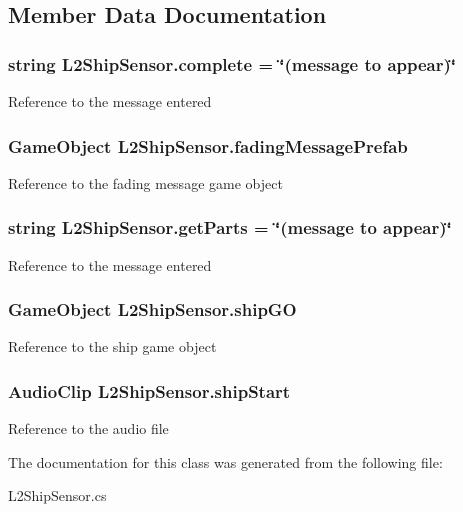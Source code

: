 \subsection{Member Data Documentation}
\hypertarget{class_l2_ship_sensor_aa262461caa8e7f1eaa5e65cc949cd16b}{
\subsubsection[{complete}]{\setlength{\rightskip}{0pt plus 5cm}string L2\-Ship\-Sensor.\-complete = \char`\"{}(message to appear)\char`\"{}}}\label{class_l2_ship_sensor_aa262461caa8e7f1eaa5e65cc949cd16b}
Reference to the message entered \hypertarget{class_l2_ship_sensor_a2d8958af9884c632331a9e031b9cfc78}{
\subsubsection[{fading\-Message\-Prefab}]{\setlength{\rightskip}{0pt plus 5cm}Game\-Object L2\-Ship\-Sensor.\-fading\-Message\-Prefab}}\label{class_l2_ship_sensor_a2d8958af9884c632331a9e031b9cfc78}
Reference to the fading message game object \hypertarget{class_l2_ship_sensor_ab0ce9e2c72170c03532ad0f45ab105c1}{
\subsubsection[{get\-Parts}]{\setlength{\rightskip}{0pt plus 5cm}string L2\-Ship\-Sensor.\-get\-Parts = \char`\"{}(message to appear)\char`\"{}}}\label{class_l2_ship_sensor_ab0ce9e2c72170c03532ad0f45ab105c1}
Reference to the message entered \hypertarget{class_l2_ship_sensor_a116a957e82ee35d2680cafd6d2dd53c0}{
\subsubsection[{ship\-G\-O}]{\setlength{\rightskip}{0pt plus 5cm}Game\-Object L2\-Ship\-Sensor.\-ship\-G\-O}}\label{class_l2_ship_sensor_a116a957e82ee35d2680cafd6d2dd53c0}
Reference to the ship game object \hypertarget{class_l2_ship_sensor_a92c76b2b502112bc9c298154f77c76b1}{
\subsubsection[{ship\-Start}]{\setlength{\rightskip}{0pt plus 5cm}Audio\-Clip L2\-Ship\-Sensor.\-ship\-Start}}\label{class_l2_ship_sensor_a92c76b2b502112bc9c298154f77c76b1}
Reference to the audio file 

The documentation for this class was generated from the following file\-:\begin{DoxyCompactItemize}
\item 
L2\-Ship\-Sensor.\-cs\end{DoxyCompactItemize}
